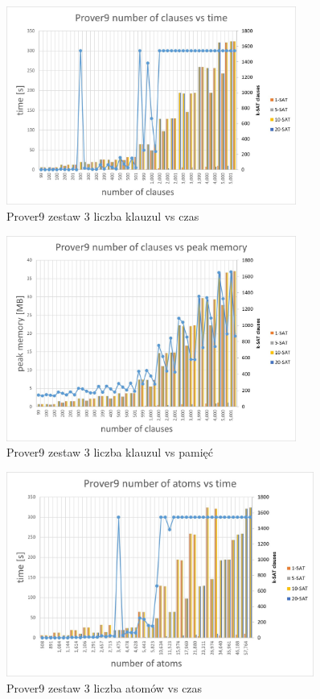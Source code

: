 \documentclass[a4paper,12pt]{article}
\begin{document}
\begin{figure}[H]
  \centerline{\includegraphics[width=0.85\textwidth]{outputs/set3/set3 charts/01 Prover9 number of clauses vs time.jpg}}
  \caption{Prover9 zestaw 3 liczba klauzul vs czas}
\end{figure}

\begin{figure}[H]
  \centerline{\includegraphics[width=0.85\textwidth]{outputs/set3/set3 charts/02 Prover9 number of clauses vs peak memory.jpg}}
  \caption{Prover9 zestaw 3 liczba klauzul vs pamięć}
\end{figure}

\begin{figure}[H]
  \centerline{\includegraphics[width=0.9\textwidth]{outputs/set3/set3 charts/03 Prover9 number of atoms vs time.jpg}}
  \caption{Prover9 zestaw 3 liczba atomów vs czas}
\end{figure}
\end{document}
